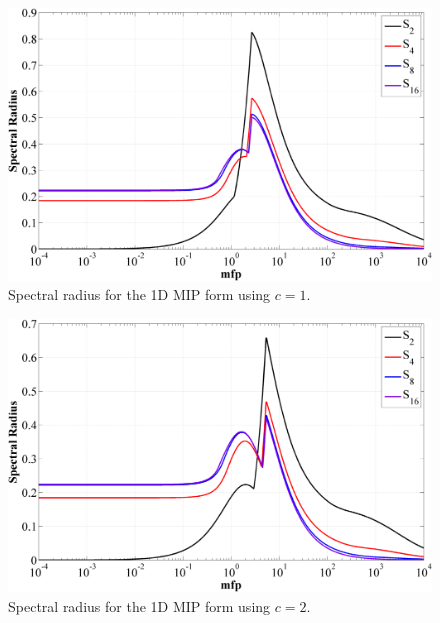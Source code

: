 \begin{figure}
\centering
\includegraphics[width=\textwidth]{figures/appendices/DSA_1D_SI_MIP_C=1.png}
\caption{Spectral radius for the 1D MIP form using $c=1$.}
\label{fig::1D_MIP_c=1}
\end{figure}

\begin{figure}
\centering
\includegraphics[width=\textwidth]{figures/appendices/DSA_1D_SI_MIP_C=2.png}
\caption{Spectral radius for the 1D MIP form using $c=2$.}
\label{fig::1D_MIP_c=2}
\end{figure}

